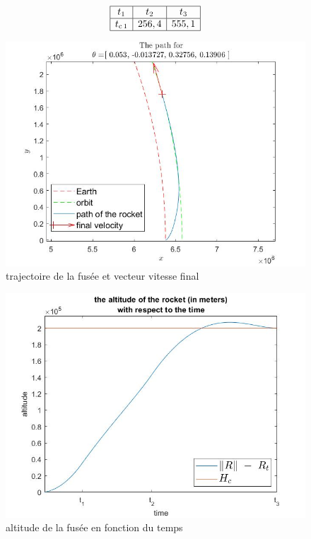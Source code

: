 \[\begin{array}{|c|c|c|}\hline
t_{1} & t_{2} & t_{3}\\\hline
t_{\mathrm{c}\,1} & 256,4 & 555,1\\\hline
\end{array}\]

\clearpage
\begin{center}
\begin{figure}[t]
\includegraphics[scale=0.55]{./graphs/path.jpg}
\caption{trajectoire de la fusée et vecteur vitesse final}
\end{figure}
\end{center}


\begin{center}
\begin{figure}[t]
\includegraphics[scale=0.55]{./graphs/altitude.jpg}
\caption{altitude de la fusée en fonction du temps}
\end{figure}
\end{center}

